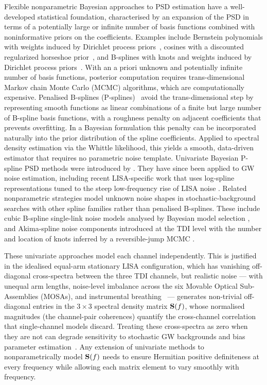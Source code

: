 \documentclass[%
	reprint,
	nofootinbib,
	amsmath,
	amssymb,
	aps,
]{revtex4-2}
\renewcommand{\S}{{\bf S}}
\begin{document}
    Flexible nonparametric Bayesian approaches to PSD estimation have a well-developed
    statistical foundation, characterised by an expansion of the PSD in terms of a
    potentially large or infinite number of basis functions combined with noninformative priors on the
    coefficients. Examples include
    Bernstein polynomials with weights induced by Dirichlet process priors~\citep{beyond_whittle},
    cosines with a discounted regularized horseshoe prior~\citep{jianan_vi_sgvb_et}, and
    B-splines with knots and weights induced by Dirichlet process priors~\citep{edwards_bayesian_2019}.
    With an a priori unknown and potentially infinite number of basis functions, posterior
    computation requires trans-dimensional Markov chain Monte Carlo (MCMC) algorithms,
    which are computationally expensive. Penalised B-splines (P-splines)~\citep{EilersMarx1996}
    avoid the trans-dimensional step by representing smooth functions as linear combinations
    of a finite but large number of B-spline basis functions, with a roughness penalty on
    adjacent coefficients that prevents overfitting. In a Bayesian formulation this
    penalty can be incorporated naturally into the prior distribution of the
    spline coefficients. Applied to
    spectral density estimation via the Whittle likelihood, this yields a
    smooth, data-driven estimator that requires no parametric noise template.
    Univariate Bayesian P-spline PSD methods were introduced by
    \citet{maturana-russel_bayesian_2021}. They have since been applied to GW
    noise estimation, including recent LISA-specific work that uses log-spline
    representations tuned to the steep low-frequency rise of LISA noise
    \citep{aimen2026lisa}. Related nonparametric strategies model unknown noise
    shapes in stochastic-background searches with other spline families rather
    than penalised B-splines. These include cubic B-spline single-link noise
    models analysed by Bayesian model selection \citep{baghi_uncovering_2023},
    and Akima-spline noise components introduced at the TDI level with the
    number and location of knots inferred by a reversible-jump MCMC
    \citep{santini2025sgwb}.
     
    These univariate approaches model each channel independently. This is
    justified in the idealised equal-arm stationary LISA configuration, which
    has vanishing off-diagonal cross-spectra between the three TDI channels,
    but realistic noise --- with unequal arm lengths, noise-level imbalance
    across the six Movable Optical Sub-Assemblies (MOSAs), and
    instrumental breathing~\citep{muratore2021instrumental} --- generates
    non-trivial off-diagonal entries in the $3\times 3$ spectral density
    matrix $\S(f)$, whose normalised magnitudes (the channel-pair
    coherences) quantify the cross-channel correlation that
    single-channel models discard. Treating these cross-spectra as zero when they are not
    can degrade sensitivity to stochastic GW backgrounds and bias parameter
    estimation~\citep{CiredduLnLforNetwork,sgwb-unequal-noise-lisa-olaf}.
    Any extension of univariate methods to nonparametrically model $\S(f)$
    needs to ensure Hermitian positive definiteness
    at every frequency while allowing each matrix element to vary smoothly
    with frequency.
     
\end{document}
